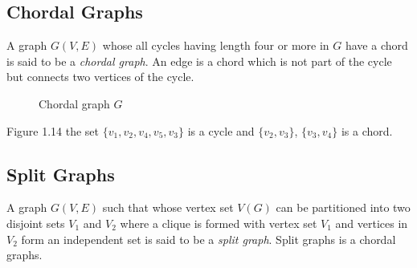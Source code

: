 \subsection{Chordal Graphs}
\noindent
A graph $G(V,E)$ whose all cycles having length four or more in $G$ have a chord is said to be a \textit{chordal graph}. An edge is a chord which is not part of the cycle but connects two vertices of the cycle. 
\begin{figure}[H]
\centering
{}
\caption{Chordal graph $G$}
\end{figure}
\noindent
Figure 1.14 the set $ \{ v_1,v_2,v_4,v_5,v_3\}$ is a cycle and $\{ v_2,v_3\}$, $\{ v_3,v_4\}$ is a chord.


\subsection{Split Graphs}
\noindent
A graph $G(V,E)$ such that whose vertex set $V(G)$ can be partitioned into two disjoint sets $V_1$ and $V_2$ where a clique is formed with vertex set $V_1$ and vertices in $V_2$ form an independent set is said to be a \textit{split graph}. Split graphs is a chordal graphs. \\ \smallskip

